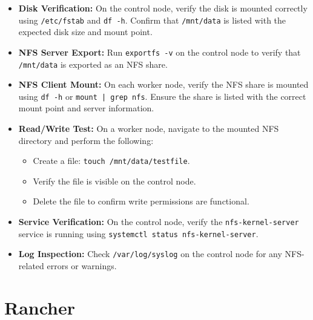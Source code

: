 \begin{itemize}
    \item \textbf{Disk Verification:} On the control node, verify the disk is mounted correctly using \texttt{/etc/fstab} and \texttt{df -h}. Confirm that \texttt{/mnt/data} is listed with the expected disk size and mount point.
    
    \item \textbf{NFS Server Export:} Run \texttt{exportfs -v} on the control node to verify that \texttt{/mnt/data} is exported as an NFS share.
    
    \item \textbf{NFS Client Mount:} On each worker node, verify the NFS share is mounted using \texttt{df -h} or \texttt{mount | grep nfs}. Ensure the share is listed with the correct mount point and server information.
    
    \item \textbf{Read/Write Test:} On a worker node, navigate to the mounted NFS directory and perform the following:
    \begin{itemize}
        \item Create a file: \texttt{touch /mnt/data/testfile}.
        \item Verify the file is visible on the control node.
        \item Delete the file to confirm write permissions are functional.
    \end{itemize}
    
    \item \textbf{Service Verification:} On the control node, verify the \texttt{nfs-kernel-server} service is running using \texttt{systemctl status nfs-kernel-server}.
    
    \item \textbf{Log Inspection:} Check \texttt{/var/log/syslog} on the control node for any NFS-related errors or warnings.
\end{itemize}

\section{Rancher}

